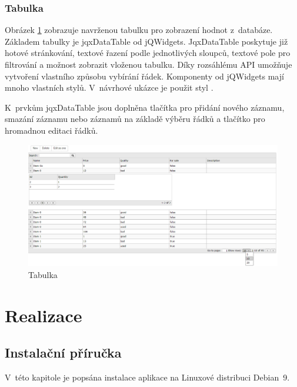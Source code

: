 \documentclass[thesis=B,czech]{FITthesis}[2012/06/26]
\begin{document}
\subsection{Tabulka}
	Obrázek \ref{tabulka} zobrazuje navrženou tabulku pro zobrazení hodnot z~databáze. Základem tabulky je jqxDataTable\cite{jqx_dataTable} od jQWidgets. JqxDataTable poskytuje již hotové stránkování, textové řazení podle jednotlivých sloupců, textové pole pro filtrování a možnost zobrazit vloženou tabulku. Díky rozsáhlému API umožňuje vytvoření vlastního způsobu vybírání řádek. Komponenty od jQWidgets mají mnoho vlastních stylů. V~návrhové ukázce je použit styl .
	
	K~prvkům jqxDataTable jsou doplněna tlačítka pro přidání nového záznamu, smazání záznamu nebo záznamů na základě výběru řádků a tlačítko pro hromadnou editaci řádků.

\begin{figure}
	\includegraphics[width=500pt, height=0.8\textwidth, angle=90]{data_table.png}
	\caption{Tabulka}\label{tabulka}
\end{figure}
	

\chapter{Realizace}

\section{Instalační příručka}
	V~této kapitole je popsána instalace aplikace na Linuxové distribuci Debian~9.
\end{document}
